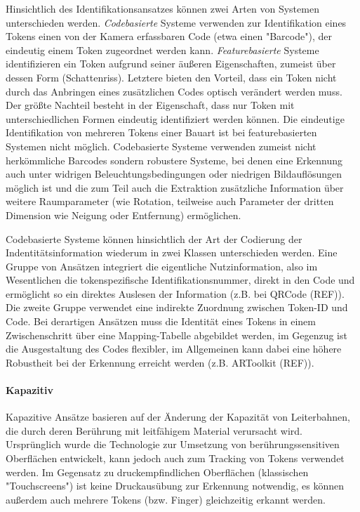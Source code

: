 Hinsichtlich des Identifikationsansatzes können zwei Arten von Systemen unterschieden werden. \emph{Codebasierte} Systeme verwenden zur Identifikation eines Tokens einen von der Kamera erfassbaren Code (etwa einen "Barcode"), der eindeutig einem Token zugeordnet werden kann. \emph{Featurebasierte} Systeme identifizieren ein Token aufgrund seiner äußeren Eigenschaften, zumeist über dessen Form (Schattenriss). Letztere bieten den Vorteil, dass ein Token nicht durch das Anbringen eines zusätzlichen Codes optisch verändert werden muss. Der größte Nachteil besteht in der Eigenschaft, dass nur Token mit unterschiedlichen Formen eindeutig identifiziert werden können. Die eindeutige Identifikation von mehreren Tokens einer Bauart ist bei featurebasierten Systemen nicht möglich. Codebasierte Systeme verwenden zumeist nicht herkömmliche Barcodes sondern robustere Systeme, bei denen eine Erkennung auch unter widrigen Beleuchtungsbedingungen oder niedrigen Bildauflösungen möglich ist und die zum Teil auch die Extraktion zusätzliche Information über weitere Raumparameter (wie Rotation, teilweise auch Parameter der dritten Dimension wie Neigung oder Entfernung) ermöglichen. 

Codebasierte Systeme können hinsichtlich der Art der Codierung der Indentitätsinformation wiederum in zwei Klassen unterschieden werden. Eine Gruppe von Ansätzen integriert die eigentliche Nutzinformation, also im Wesentlichen die tokenspezifische Identifikationsnummer, direkt in den Code und ermöglicht so ein direktes Auslesen der Information (z.B. bei QRCode (REF)). Die zweite Gruppe verwendet eine indirekte Zuordnung zwischen Token-ID und Code. Bei derartigen Ansätzen muss die Identität eines Tokens in einem Zwischenschritt über eine Mapping-Tabelle abgebildet werden, im Gegenzug ist die Ausgestaltung des Codes flexibler, im Allgemeinen kann dabei eine höhere Robustheit bei der Erkennung erreicht werden (z.B. ARToolkit (REF)).


\paragraph{Kapazitiv} %
\label{par:kapazitiv}

Kapazitive Ansätze basieren auf der Änderung der Kapazität von Leiterbahnen, die durch deren Berührung mit leitfähigem Material verursacht wird. Ursprünglich wurde die Technologie zur Umsetzung von berührungssensitiven Oberflächen entwickelt, kann jedoch auch zum Tracking von Tokens verwendet werden. Im Gegensatz zu druckempfindlichen Oberflächen (klassischen "Touchscreens") ist keine Druckausübung zur Erkennung notwendig, es können außerdem auch mehrere Tokens (bzw. Finger) gleichzeitig erkannt werden.

